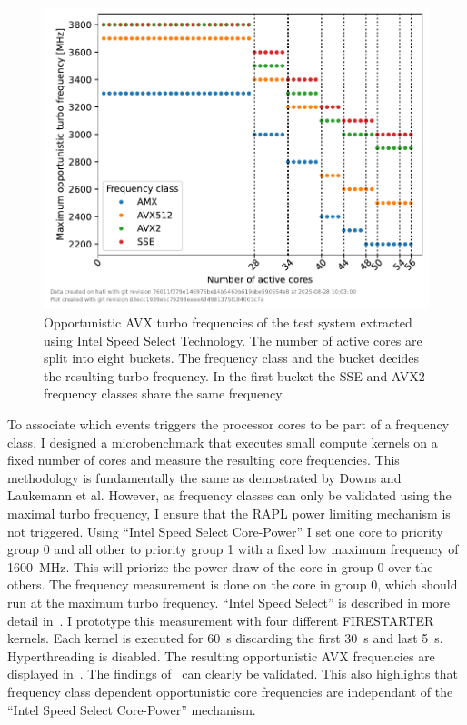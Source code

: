 \begin{figure}[]
    \centering
    \includegraphics[width=0.8\columnwidth]{fig/avx-frequency-license-bands/avx-frequency-license-bands.pdf}
    \caption{\label{fig:p0n-frequencies}Opportunistic AVX turbo frequencies of the test system extracted using Intel Speed Select Technology.
    The number of active cores are split into eight buckets. The frequency class and the bucket decides the resulting turbo frequency.
    In the first bucket the SSE and AVX2 frequency classes share the same frequency.}
\end{figure}


To associate which events triggers the processor cores to be part of a frequency class, I designed a microbenchmark that executes small compute kernels on a fixed number of cores and measure the resulting core frequencies.
This methodology is fundamentally the same as demostrated by Downs and Laukemann et al.
However, as frequency classes can only be validated using the maximal turbo frequency,
I ensure that the RAPL power limiting mechanism is not triggered.
Using ``Intel Speed Select Core-Power'' I set one core to priority group 0 and all other to priority group 1 with a fixed low maximum frequency of \SI{1600}{\MHz}.
This will priorize the power draw of the core in group 0 over the others.
The frequency measurement is done on the core in group 0, which should run at the maximum turbo frequency.
``Intel Speed Select'' is described in more detail in~.
I prototype this measurement with four different FIRESTARTER kernels.
Each kernel is executed for \SI{60}{\s} discarding the first \SI{30}{\s} and last \SI{5}{\s}.
Hyperthreading is disabled.
The resulting opportunistic AVX frequencies are displayed in~.
The findings of~ can clearly be validated.
This also highlights that frequency class dependent opportunistic core frequencies are independant of the ``Intel Speed Select Core-Power'' mechanism.

